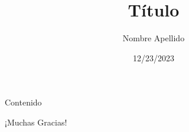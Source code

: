 \documentclass[pdf]{beamer}
\title{Título}
\author{Nombre Apellido}
\date{12/23/2023}
\begin{document}
    {
        \begin{frame}[plain]
            \titlepage
        \end{frame}
    }
    
\begin{frame}{Contenido}
    \tableofcontents
\end{frame}












\begin{frame}
\Huge{\centerline{¡Muchas Gracias!}}
\end{frame}
\end{document}
